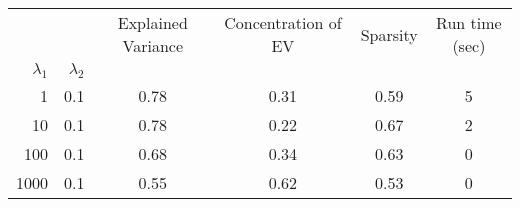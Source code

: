 \begin{tabular}{rr|cccc}
\toprule
     &     &  Explained Variance &  Concentration of EV &  Sparsity & Run time (sec) \\
$\lambda_1$ & $\lambda_2$ &                     &                      &           &                \\
\midrule
1    & 0.1 &                0.78 &                 0.31 &      0.59 &              5 \\
10   & 0.1 &                0.78 &                 0.22 &      0.67 &              2 \\
100  & 0.1 &                0.68 &                 0.34 &      0.63 &              0 \\
1000 & 0.1 &                0.55 &                 0.62 &      0.53 &              0 \\
\bottomrule
\end{tabular}
